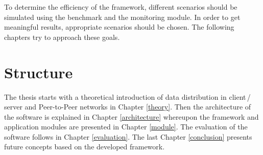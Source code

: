 To determine the efficiency of the framework, different scenarios should be simulated using the benchmark and the monitoring module. In order to get meaningful results, appropriate scenarios should be chosen. The following chapters try to approach these goals.

\section{Structure}
The thesis starts with a theoretical introduction of data distribution in client\,/\,server and Peer-to-Peer networks in Chapter \ref{theory}. Then the architecture of the software is explained in Chapter \ref{architecture} whereupon the framework and application modules are presented in Chapter \ref{module}. The evaluation of the software follows in Chapter \ref{evaluation}. The last Chapter \ref{conclusion} presents future concepts based on the developed framework.